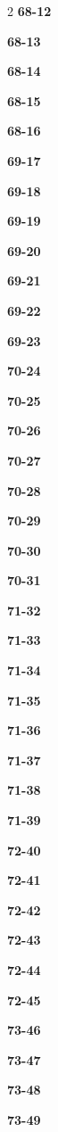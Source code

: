 \documentclass[10pt,a4paper]{article}
\begin{document}
\begin{multicols}{2}
\noindent\textbf{68-12}\ \par
\noindent\textbf{68-13}\ \par
\noindent\textbf{68-14}\ \par
\noindent\textbf{68-15}\ \par
\noindent\textbf{68-16}\ \par
\noindent\textbf{69-17}\ \par
\noindent\textbf{69-18}\ \par
\noindent\textbf{69-19}\ \par
\noindent\textbf{69-20}\ \par
\noindent\textbf{69-21}\ \par
\noindent\textbf{69-22}\ \par
\noindent\textbf{69-23}\ \par
\noindent\textbf{70-24}\ \par
\noindent\textbf{70-25}\ \par
\noindent\textbf{70-26}\ \par
\noindent\textbf{70-27}\ \par
\noindent\textbf{70-28}\ \par
\noindent\textbf{70-29}\ \par
\noindent\textbf{70-30}\ \par
\noindent\textbf{70-31}\ \par
\noindent\textbf{71-32}\ \par
\noindent\textbf{71-33}\ \par
\noindent\textbf{71-34}\ \par
\noindent\textbf{71-35}\ \par
\noindent\textbf{71-36}\ \par
\noindent\textbf{71-37}\ \par
\noindent\textbf{71-38}\ \par
\noindent\textbf{71-39}\ \par
\noindent\textbf{72-40}\ \par
\noindent\textbf{72-41}\ \par
\noindent\textbf{72-42}\ \par
\noindent\textbf{72-43}\ \par
\noindent\textbf{72-44}\ \par
\noindent\textbf{72-45}\ \par
\noindent\textbf{73-46}\ \par
\noindent\textbf{73-47}\ \par
\noindent\textbf{73-48}\ \par
\noindent\textbf{73-49}\ \par

\end{multicols}
\end{document}
